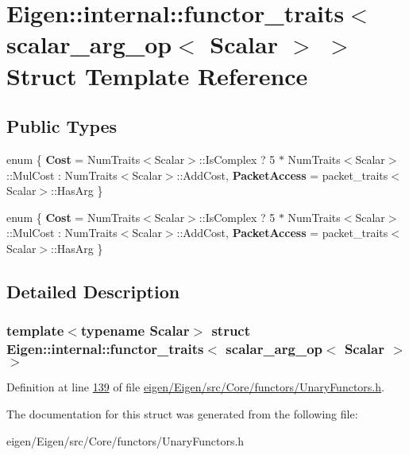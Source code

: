 \hypertarget{struct_eigen_1_1internal_1_1functor__traits_3_01scalar__arg__op_3_01_scalar_01_4_01_4}{}\section{Eigen\+:\+:internal\+:\+:functor\+\_\+traits$<$ scalar\+\_\+arg\+\_\+op$<$ Scalar $>$ $>$ Struct Template Reference}
\label{struct_eigen_1_1internal_1_1functor__traits_3_01scalar__arg__op_3_01_scalar_01_4_01_4}
\subsection*{Public Types}
\begin{DoxyCompactItemize}
\item 
\mbox{\label{struct_eigen_1_1internal_1_1functor__traits_3_01scalar__arg__op_3_01_scalar_01_4_01_4_afce195e65ca603d91a4c3e442c49ec92}} 
enum \{ {\bfseries Cost} = Num\+Traits$<$Scalar$>$\+:\+:Is\+Complex ? 5 $\ast$ Num\+Traits$<$Scalar$>$\+:\+:Mul\+Cost \+: Num\+Traits$<$Scalar$>$\+:\+:Add\+Cost, 
{\bfseries Packet\+Access} = packet\+\_\+traits$<$Scalar$>$\+:\+:Has\+Arg
 \}
\item 
\mbox{\label{struct_eigen_1_1internal_1_1functor__traits_3_01scalar__arg__op_3_01_scalar_01_4_01_4_a523b2152185665b5cf2d8bf1fcb98f04}} 
enum \{ {\bfseries Cost} = Num\+Traits$<$Scalar$>$\+:\+:Is\+Complex ? 5 $\ast$ Num\+Traits$<$Scalar$>$\+:\+:Mul\+Cost \+: Num\+Traits$<$Scalar$>$\+:\+:Add\+Cost, 
{\bfseries Packet\+Access} = packet\+\_\+traits$<$Scalar$>$\+:\+:Has\+Arg
 \}
\end{DoxyCompactItemize}


\subsection{Detailed Description}
\subsubsection*{template$<$typename Scalar$>$\newline
struct Eigen\+::internal\+::functor\+\_\+traits$<$ scalar\+\_\+arg\+\_\+op$<$ Scalar $>$ $>$}



Definition at line \hyperlink{eigen_2_eigen_2src_2_core_2functors_2_unary_functors_8h_source_l00139}{139} of file \hyperlink{eigen_2_eigen_2src_2_core_2functors_2_unary_functors_8h_source}{eigen/\+Eigen/src/\+Core/functors/\+Unary\+Functors.\+h}.



The documentation for this struct was generated from the following file\+:\begin{DoxyCompactItemize}
\item 
eigen/\+Eigen/src/\+Core/functors/\+Unary\+Functors.\+h\end{DoxyCompactItemize}
